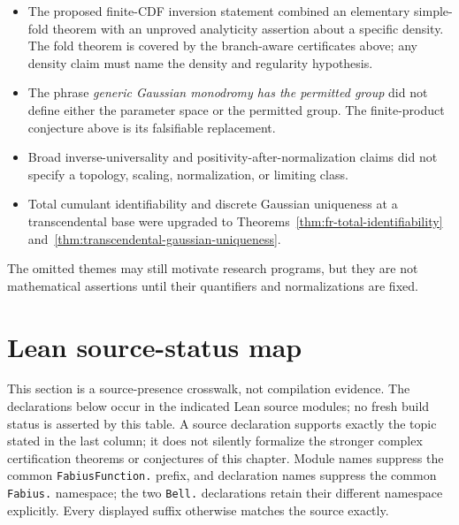 \begin{itemize}
\item The proposed finite-CDF inversion statement combined an elementary
  simple-fold theorem with an unproved analyticity assertion about a specific
  density.  The fold theorem is covered by the branch-aware certificates
  above; any density claim must name the density and regularity hypothesis.
\item The phrase \emph{generic Gaussian monodromy has the permitted group}
  did not define either the parameter space or the permitted group.  The
  finite-product conjecture above is its falsifiable replacement.
\item Broad inverse-universality and positivity-after-normalization claims did
  not specify a topology, scaling, normalization, or limiting class.
\item Total cumulant identifiability and discrete Gaussian uniqueness at a
  transcendental base were upgraded to
  Theorems~\ref{thm:fr-total-identifiability}
  and~\ref{thm:transcendental-gaussian-uniqueness}.
\end{itemize}

The omitted themes may still motivate research programs, but they are not
mathematical assertions until their quantifiers and normalizations are fixed.

\section{Lean source-status map}
\label{sec:lean-certification-map}

This section is a source-presence crosswalk, not compilation evidence.  The
declarations below occur in the indicated Lean source modules; no fresh build
status is asserted by this table.  A source declaration supports exactly the
topic stated in the last column; it does not silently formalize the stronger
complex certification theorems or conjectures of this chapter.  Module names
suppress the common
\nolinkurl{FabiusFunction.} prefix, and declaration names suppress the common
\nolinkurl{Fabius.} namespace; the two \nolinkurl{Bell.} declarations retain
their different namespace explicitly.  Every displayed suffix otherwise
matches the source exactly.

